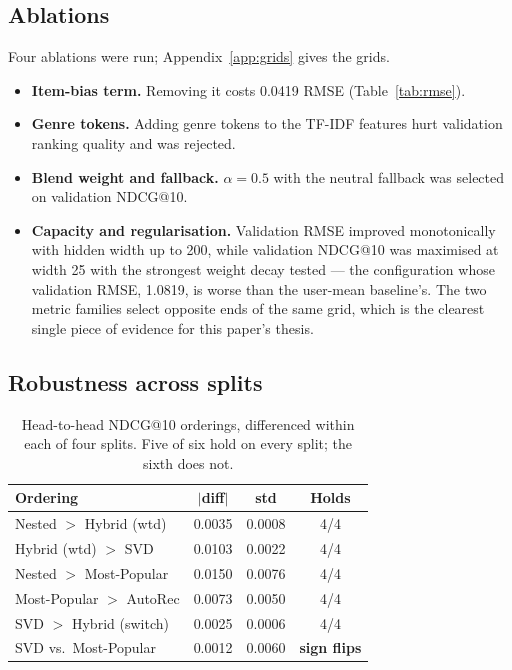 \documentclass[10pt,twocolumn,letterpaper]{article}
\begin{document}
\subsection{Ablations}\label{sec:ablation}
Four ablations were run; Appendix~\ref{app:grids} gives the grids.

\begin{itemize}\itemsep2pt
\item \textbf{Item-bias term.} Removing it costs 0.0419 RMSE
      (Table~\ref{tab:rmse}).
\item \textbf{Genre tokens.} Adding genre tokens to the TF-IDF features hurt
      validation ranking quality and was rejected.
\item \textbf{Blend weight and fallback.} $\alpha = 0.5$ with the neutral
      fallback was selected on validation NDCG@10.
\item \textbf{Capacity and regularisation.} Validation RMSE improved
      monotonically with hidden width up to 200, while validation NDCG@10 was
      maximised at width 25 with the strongest weight decay tested --- the
      configuration whose validation RMSE, 1.0819, is worse than the user-mean
      baseline's. The two metric families select opposite ends of the same
      grid, which is the clearest single piece of evidence for this paper's
      thesis.
\end{itemize}

\subsection{Robustness across splits}\label{sec:robust}
\begin{table}[t]\centering\small
\begin{tabular}{lccc}
\toprule
Ordering & $|$diff$|$ & std & Holds \\
\midrule
Nested $>$ Hybrid (wtd)   & 0.0035 & 0.0008 & 4/4 \\
Hybrid (wtd) $>$ SVD      & 0.0103 & 0.0022 & 4/4 \\
Nested $>$ Most-Popular   & 0.0150 & 0.0076 & 4/4 \\
Most-Popular $>$ AutoRec  & 0.0073 & 0.0050 & 4/4 \\
SVD $>$ Hybrid (switch)   & 0.0025 & 0.0006 & 4/4 \\
SVD vs.\ Most-Popular     & 0.0012 & 0.0060 & \textbf{sign flips} \\
\bottomrule
\end{tabular}
\caption{Head-to-head NDCG@10 orderings, differenced within each of four
splits. Five of six hold on every split; the sixth does not.}
\label{tab:robust}
\end{table}
\end{document}
